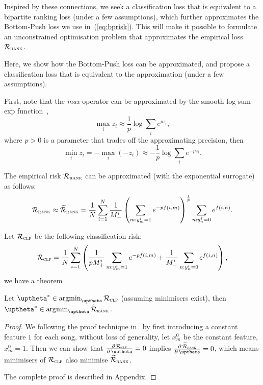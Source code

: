 Inspired by these connections, we seek a classification loss that is equivalent to a bipartite ranking loss (under a few assumptions), 
which further approximates the Bottom-Push loss we use in~(\ref{eq:bprisk}).
This will make it possible to formulate an unconstrained optimisation problem that approximates the empirical loss $\mathcal{R}_\textsc{rank}$.

Here, we show how the Bottom-Push loss can be approximated,
and propose a classification loss that is equivalent to the approximation (under a few assumptions).

First, note that the \emph{max} operator can be approximated by the smooth log-sum-exp function~\cite[p. 72]{boyd2004convex},
$$
\max_i z_i \approx \frac{1}{p} \log \sum_i e^{p z_i},
$$
where $p > 0$ is a parameter that trades off the approximating precision, then
$$
\min_i z_i = -\max_i (-z_i) \approx -\frac{1}{p} \log \sum_i e^{-p z_i}.
$$

The empirical risk $\mathcal{R}_\textsc{rank}$ can be approximated (with the exponential surrogate) as follows:
\begin{equation*}
\begin{aligned}
\mathcal{R}_\textsc{rank} 
\approx \widetilde{\mathcal{R}}_\textsc{rank}
= \frac{1}{N} \sum_{i=1}^N \frac{1}{M_-^i} \left( \sum_{m: y_m^i = 1} e^{-p f(i, m)} \right)^\frac{1}{p} \sum_{n: y_n^i = 0} e^{f(i, n)}.
\end{aligned}
\end{equation*}

Let $\mathcal{R}_\textsc{clf}$ be the following classification risk:
\begin{equation*}
\mathcal{R}_\textsc{clf} 
= \frac{1}{N} \sum_{i=1}^N \left( 
  \frac{1}{p M_+^i} \sum_{m: y_m^i = 1} e^{-p f(i, m)} 
  + \frac{1}{M_-^i} \sum_{n: y_n^i = 0} e^{f(i, n)} \right),
\end{equation*}
we have a theorem
\begin{theorem}
\label{th:rank2clf}
Let $\uptheta^* \in \argmin_{\uptheta} \RCal_\textsc{clf}$ (assuming minimisers exist), 
then $\uptheta^* \in \argmin_{\uptheta} \widetilde\RCal_\textsc{rank}$.
\end{theorem}

\begin{proof}
We following the proof technique in~\cite{ertekin2011equivalence}
by first introducing a constant feature $1$ for each song,
without loss of generality, let $x_m^0$ be the constant feature, \ie $x_m^0 = 1$.
Then we can show that 
$\frac{\partial \, \RCal_\textsc{clf}} {\partial \, \uptheta} = 0$ implies
$\frac{\partial \, \widetilde\RCal_\textsc{rank}} {\partial \, \uptheta} = 0$,
which means minimisers of $\mathcal{R}_\textsc{clf}$ also minimise $\widetilde{\mathcal{R}}_\textsc{rank}$.

The complete proof is described in Appendix.
\end{proof}


